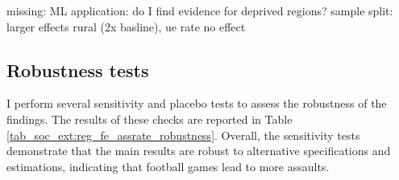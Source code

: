{\color{red} missing: ML application: do I find evidence for deprived regions?}\newline
sample split: larger effects rural (2x basline), ue rate no effect 










\subsection{Robustness tests}
I perform several sensitivity and placebo tests to assess the robustness of the findings. The results of these checks are reported in Table \ref{tab_soc_ext:reg_fe_assrate_robustness}. Overall, the sensitivity tests demonstrate that the main results are robust to alternative specifications and estimations, indicating that football games lead to more assaults.\newline




